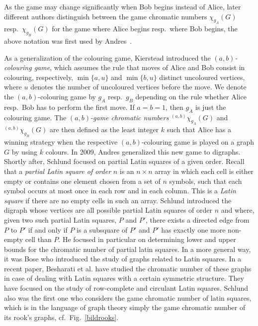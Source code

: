 \documentclass{article}
\newcommand{\gcn}[4]{\ensuremath{{}^{({#1},{#2})}\chi_{g#4}({#3})}}
\newcommand{\gcna}[3]{\ensuremath{\gcn{#1}{#2}{#3}{_A}}}
\newcommand{\gcnb}[3]{\ensuremath{\gcn{#1}{#2}{#3}{_B}}}
\begin{document}
As the game may change significantly when Bob begins instead of Alice, later different authors \cite{andresforest,zhucartesian} distinguish between the game chromatic numbers $\chi_{g_A}(G)$ resp.\ $\chi_{g_B}(G)$
for the game where Alice begins resp.\ where Bob begins, the above notation was first used by Andres~\cite{andresgpg}. 

As a generalization of the colouring game, Kierstead \cite{Kierstead2005} introduced the {\em $(a,b)$-colouring game}, which assumes the rule that moves of Alice and Bob consist in 
colouring, respectively, $\min\{a,u\}$ and $\min\{b,u\}$ 
distinct uncoloured vertices, where $u$ denotes the number of uncoloured vertices before the move. We denote the $(a,b)$-colouring game by $g_A$ resp.\ $g_B$ depending on the rule 
whether Alice resp.\ Bob has to perform the first move.
If \mbox{$a=b=1$}, then $g_A$ is just the colouring game.  
The {\em $(a,b)$-game chromatic numbers} $\gcna{a}{b}{G}$ and $\gcnb{a}{b}{G}$ are then defined as the least integer $k$ such that 
Alice has a winning strategy when the respective $(a,b)$-colouring game  is played on a graph $G$ by using $k$ colours. 
In 2009, Andres 
\cite{Andres2009} generalized this new game to digraphs. Shortly after,  Schlund \cite{Schlund2011} focused on 
partial Latin squares of a given order. Recall that a {\em partial Latin square of order} $n$ 
is an $n\times n$ array in which each cell is either empty or contains one  element chosen from a set of $n$ symbols, such that each symbol occurs at most once in each row and in each column. This is a {\em Latin square} 
if there are no empty cells in such an array. 
Schlund introduced the digraph  whose vertices are all possible partial Latin squares of order $n$ and where, given two such partial Latin squares, $P$ and $P'$, there exists 
a directed edge from $P$ to $P'$ if and only if $P$ is a subsquare of $P'$ and  $P'$ has exactly one more non-empty cell than $P$. 
He focused in particular on determining lower and upper bounds for the chromatic number 
of partial latin squares. In a more general way, it was Bose \cite{Bose1963} who introduced  the study of graphs related to Latin squares. In a recent paper, Besharati et al. \cite{Besharati2016} have studied the 
chromatic number 
of these graphs in case of dealing with Latin squares with a certain symmetric structure.  They have focused on the study of row-complete and circulant Latin squares.
Schlund also was the first one who considers the game chromatic number of latin squares, which is in the language of graph theory simply the game chromatic number of its rook's graphs, cf.\ Fig.~\ref{bildrooks}.
\end{document}
